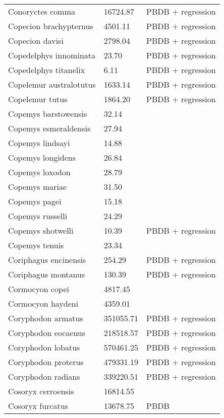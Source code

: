 \documentclass{article}
\begin{document}
\begin{center}
\begin{longtable}{p{} p{} p{} }
  Conoryctes comma & 16724.87 & PBDB + regression \\ 
  Copecion brachypternus & 4501.11 & PBDB + regression \\ 
  Copecion davisi & 2798.04 & PBDB + regression \\ 
  Copedelphys innominata & 23.70 & PBDB + regression \\ 
  Copedelphys titanelix & 6.11 & PBDB + regression \\ 
  Copelemur australotutus & 1633.14 & PBDB + regression \\ 
  Copelemur tutus & 1864.20 & PBDB + regression \\ 
  Copemys barstowensis & 32.14 & \cite{Tomiya2013} \\ 
  Copemys esmeraldensis & 27.94 & \cite{Tomiya2013} \\ 
  Copemys lindsayi & 14.88 & \cite{Tomiya2013} \\ 
  Copemys longidens & 26.84 & \cite{Tomiya2013} \\ 
  Copemys loxodon & 28.79 & \cite{Tomiya2013} \\ 
  Copemys mariae & 31.50 & \cite{Tomiya2013} \\ 
  Copemys pagei & 15.18 & \cite{Tomiya2013} \\ 
  Copemys russelli & 24.29 & \cite{Tomiya2013} \\ 
  Copemys shotwelli & 10.39 & PBDB + regression \\ 
  Copemys tenuis & 23.34 & \cite{Tomiya2013} \\ 
  Coriphagus encinensis & 254.29 & PBDB + regression \\ 
  Coriphagus montanus & 130.39 & PBDB + regression \\ 
  Cormocyon copei & 4817.45 & \cite{Tomiya2013} \\ 
  Cormocyon haydeni & 4359.01 & \cite{Tomiya2013} \\ 
  Coryphodon armatus & 351055.71 & PBDB + regression \\ 
  Coryphodon eocaenus & 218518.57 & PBDB + regression \\ 
  Coryphodon lobatus & 570461.25 & PBDB + regression \\ 
  Coryphodon proterus & 479331.19 & PBDB + regression \\ 
  Coryphodon radians & 339220.51 & PBDB + regression \\ 
  Cosoryx cerroensis & 16814.55 & \cite{Tomiya2013} \\ 
  Cosoryx furcatus & 13678.75 & PBDB \\ 

\end{longtable}
\end{center}
\end{document}
